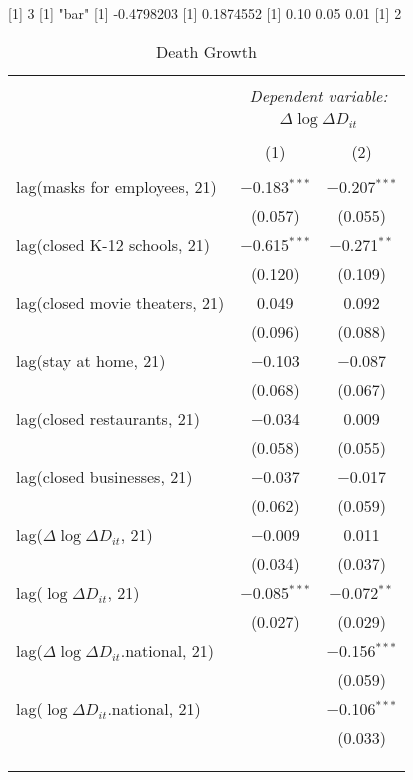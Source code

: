 [1] 3
[1] "bar"
[1] -0.4798203
[1] 0.1874552
[1] 0.10 0.05 0.01
[1] 2

\begin{table}[!htbp] \centering 
  \caption{Death Growth} 
  \label{} 
\begin{tabular}{@{\extracolsep{1pt}}lcc} 
\\[-1.8ex]\hline 
\hline \\[-1.8ex] 
 & \multicolumn{2}{c}{\textit{Dependent variable:}} \\ 
\cline{2-3} 
 & \multicolumn{2}{c}{$\Delta \log \Delta D_{it}$} \\ 
\\[-1.8ex] & (1) & (2)\\ 
\hline \\[-1.8ex] 
 lag(masks for employees, 21) & $-$0.183$^{***}$ & $-$0.207$^{***}$ \\ 
  & (0.057) & (0.055) \\ 
  lag(closed K-12 schools, 21) & $-$0.615$^{***}$ & $-$0.271$^{**}$ \\ 
  & (0.120) & (0.109) \\ 
  lag(closed movie theaters, 21) & 0.049 & 0.092 \\ 
  & (0.096) & (0.088) \\ 
  lag(stay at home, 21) & $-$0.103 & $-$0.087 \\ 
  & (0.068) & (0.067) \\ 
  lag(closed restaurants, 21) & $-$0.034 & 0.009 \\ 
  & (0.058) & (0.055) \\ 
  lag(closed businesses, 21) & $-$0.037 & $-$0.017 \\ 
  & (0.062) & (0.059) \\ 
  lag($\Delta \log \Delta D_{it}$, 21) & $-$0.009 & 0.011 \\ 
  & (0.034) & (0.037) \\ 
  lag($\log \Delta D_{it}$, 21) & $-$0.085$^{***}$ & $-$0.072$^{**}$ \\ 
  & (0.027) & (0.029) \\ 
  lag($\Delta \log \Delta D_{it}$.national, 21) &  & $-$0.156$^{***}$ \\ 
  &  & (0.059) \\ 
  lag($\log \Delta D_{it}$.national, 21) &  & $-$0.106$^{***}$ \\ 
  &  & (0.033) \\ 
   &  &  \\ 
  &  &  \\ 
 \hline \\[-1.8ex] 

\end{tabular}
\end{table}
